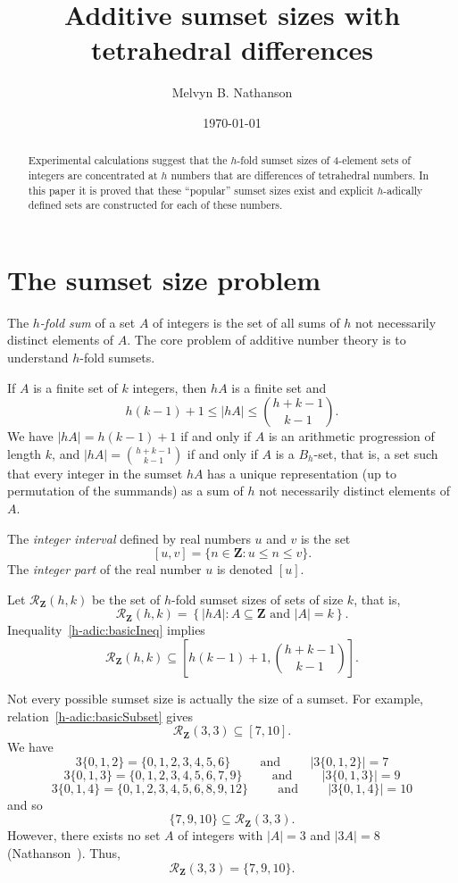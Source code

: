 \documentclass{amsart}
\title[Tetrahedral differences]{Additive sumset sizes with tetrahedral differences}
\author{Melvyn B.  Nathanson}
\date{\today}
\newcommand{\beq}{\begin{equation}}
\newcommand{\eeq}{\end{equation}}
\newcommand{\Z}{\ensuremath{\mathbf Z}}
\newcommand{\mcr}{\ensuremath{ \mathcal R}}
\DeclareMathOperator{\qqand}{\qquad\text{and}\qquad}
\begin{document}
 

\begin{abstract}
Experimental calculations suggest that the $h$-fold sumset 
sizes of 4-element sets of integers are concentrated at $h$ numbers 
that are differences of tetrahedral numbers.  In this paper it is proved 
that these ``popular'' sumset sizes exist and explicit $h$-adically defined 
sets are constructed for each of these numbers. 
\end{abstract}



 \maketitle


\section{The sumset size problem}
The \emph{$h$-fold sum} of a set $A$ of integers is the set of all sums of $h$ 
not necessarily distinct elements of $A$. 
The core problem of additive number theory is to understand $h$-fold sumsets.  

If $A$ is a finite set of $k$ integers, then $hA$ is a finite set and 
\beq          \label{h-adic:basicIneq}
h(k-1)+1 \leq |hA| \leq \binom{h+k-1}{k-1}.
\eeq
We have $|hA| = h(k-1)+1$ if and only if $A$ is an arithmetic progression of length $k$, 
and $|hA| = \binom{h+k-1}{k-1}$ if and only if $A$ is a $B_h$-set, that is, a set 
such that every integer in the sumset $hA$ has a unique representation 
(up to permutation of the summands) as a sum of $h$ 
not necessarily distinct elements of $A$. 

The \emph{integer interval} defined by real numbers $u$ and $v$ is the set 
\[
[u,v] = \{n \in \Z: u \leq n \leq v\}.
\]
The \emph{integer part} of the real number $u$ is denoted $[u]$.

Let $\mcr_{\Z}(h,k)$ be the set of $h$-fold sumset sizes of sets of size $k$, that is, 
\[
\mcr_{\Z}(h,k) = \left\{ |hA|:A\subseteq \Z \text{ and } |A|=k \right\}.
\]
Inequality~\eqref{h-adic:basicIneq} implies 
\beq          \label{h-adic:basicSubset}
\mcr_{\Z}(h,k)  \subseteq \left[ h(k-1)+1, \binom{h+k-1}{k-1} \right].
\eeq

Not every possible sumset size is actually the size of a sumset.  
For example, relation~\eqref{h-adic:basicSubset} gives  
\[
\mcr_{\Z}(3,3)  \subseteq \left[ 7, 10 \right].
\]
We have 
\[
3\{0,1,2\} = \{0,1,2,3,4,5,6\} \qqand |3\{0,1,2\}| = 7
\]
\[
3\{0,1,3\} = \{0,1,2,3,4,5,6,7,9\} \qqand |3\{0,1,3\}| = 9
\]
\[
3\{0,1,4\} = \{0,1,2,3,4,5,6,8,9,12\} \qqand |3\{0,1,4\}| = 10 
\]
and so 
\[
 \{7,9,10\} \subseteq  \mcr_{\Z}(3,3).  
\]
However, there exists no set $A$ of integers 
with $|A| = 3$ and $|3A|=8$ (Nathanson~\cite{nath25bb}).  
Thus,  
\[
\mcr_{\Z}(3,3) = \{7,9,10\}.  
\]
\end{document}
